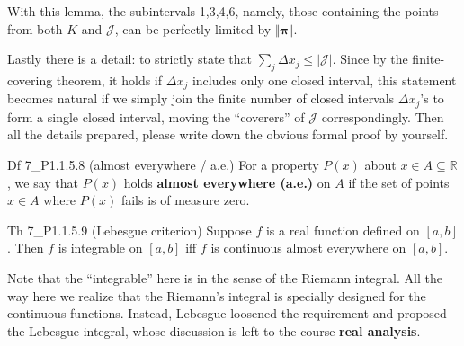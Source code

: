\documentclass{article}
\begin{document}
With this lemma, the subintervals 1,3,4,6, namely, those containing the points from both $K$ and $\mathcal{J}$, can be perfectly limited by $\Vert \pmb{\pi} \Vert$. 

Lastly there is a detail: to strictly state that $\sum_j \Delta x_j \leq |\mathcal{J}|$. Since by the finite-covering theorem, it holds if $\Delta x_j$ includes only one closed interval, this statement becomes natural if we simply join the finite number of closed intervals $\Delta x_j$'s to form a single closed interval, moving the ``coverers'' of $\mathcal{J}$ correspondingly. Then all the details prepared, please write down the obvious formal proof by yourself.

\begin{Df}{Df 7\_P1.1.5.8 (almost everywhere / a.e.)}
    For a property $P(x)$ about $x\in A\subseteq\mathbb{R}$, we say that $P(x)$ holds \textbf{almost everywhere (a.e.)} on $A$ if the set of points $x\in A$ where $P(x)$ fails is of measure zero.
\end{Df}

\begin{Th}{Th 7\_P1.1.5.9 (Lebesgue criterion)}
    Suppose $f$ is a real function defined on $[a,b]$. Then $f$ is integrable on $[a,b]$ iff $f$ is continuous almost everywhere on $[a,b]$.
\end{Th}

Note that the ``integrable'' here is in the sense of the Riemann integral. All the way here we realize that the Riemann's integral is specially designed for the continuous functions. Instead, Lebesgue loosened the requirement and proposed the Lebesgue integral, whose discussion is left to the course \textbf{real analysis}.
\end{document}
